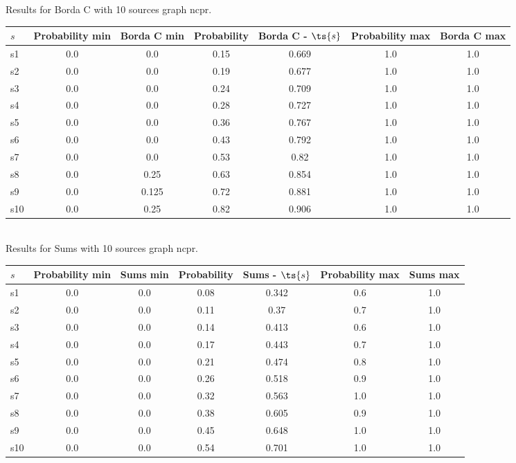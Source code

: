\documentclass{article}
\begin{document}
\noindent Results for Borda C with 10 sources graph ncpr.

\noindent\begin{tabular}{|l|c|c|c|c|c|c|}
\hline
$s$& Probability min & Borda C min & Probability & Borda C - $\ts{s}$ & Probability max & Borda C max\\
\hline
s1 &0.0 & 0.0 & 0.15 & 0.669 & 1.0 & 1.0\\
\hline
s2 &0.0 & 0.0 & 0.19 & 0.677 & 1.0 & 1.0\\
\hline
s3 &0.0 & 0.0 & 0.24 & 0.709 & 1.0 & 1.0\\
\hline
s4 &0.0 & 0.0 & 0.28 & 0.727 & 1.0 & 1.0\\
\hline
s5 &0.0 & 0.0 & 0.36 & 0.767 & 1.0 & 1.0\\
\hline
s6 &0.0 & 0.0 & 0.43 & 0.792 & 1.0 & 1.0\\
\hline
s7 &0.0 & 0.0 & 0.53 & 0.82 & 1.0 & 1.0\\
\hline
s8 &0.0 & 0.25 & 0.63 & 0.854 & 1.0 & 1.0\\
\hline
s9 &0.0 & 0.125 & 0.72 & 0.881 & 1.0 & 1.0\\
\hline
s10 &0.0 & 0.25 & 0.82 & 0.906 & 1.0 & 1.0\\
\hline
\end{tabular}\\

\noindent Results for Sums with 10 sources graph ncpr.

\noindent\begin{tabular}{|l|c|c|c|c|c|c|}
\hline
$s$& Probability min & Sums min & Probability & Sums - $\ts{s}$ & Probability max & Sums max\\
\hline
s1 &0.0 & 0.0 & 0.08 & 0.342 & 0.6 & 1.0\\
\hline
s2 &0.0 & 0.0 & 0.11 & 0.37 & 0.7 & 1.0\\
\hline
s3 &0.0 & 0.0 & 0.14 & 0.413 & 0.6 & 1.0\\
\hline
s4 &0.0 & 0.0 & 0.17 & 0.443 & 0.7 & 1.0\\
\hline
s5 &0.0 & 0.0 & 0.21 & 0.474 & 0.8 & 1.0\\
\hline
s6 &0.0 & 0.0 & 0.26 & 0.518 & 0.9 & 1.0\\
\hline
s7 &0.0 & 0.0 & 0.32 & 0.563 & 1.0 & 1.0\\
\hline
s8 &0.0 & 0.0 & 0.38 & 0.605 & 0.9 & 1.0\\
\hline
s9 &0.0 & 0.0 & 0.45 & 0.648 & 1.0 & 1.0\\
\hline
s10 &0.0 & 0.0 & 0.54 & 0.701 & 1.0 & 1.0\\
\hline
\end{tabular}\\
\end{document}
